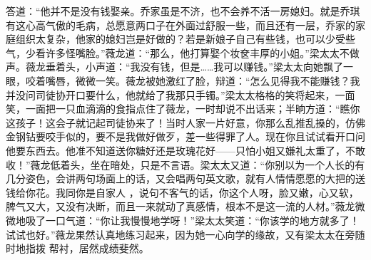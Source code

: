 \documentclass{article}
\begin{document}
\newpage
答道：“他并不是没有钱娶亲。乔家虽是不济，也不会养不活一房媳妇。就是乔琪有这心高气傲的毛病，总愿意两口子在外面过舒服一些，而且还有一层，乔家的家庭组织太复杂，他家的媳妇岂是好做的？若是新娘子自己有些钱，也可以少受些气，少看许多怪嘴脸。”薇龙道：“那么，他打算娶个妆奁丰厚的小姐。”梁太太不做声。薇龙垂着头，小声道：“我没有钱，但是……我可以赚钱。”梁太太向她飘了一眼，咬着嘴唇，微微一笑。薇龙被她激红了脸，辩道：“怎么见得我不能赚钱？我并没问司徒协开口要什么，他就给了我那只手镯。”梁太太格格的笑将起来，一面笑，一面把一只血滴滴的食指点住了薇龙，一时却说不出话来；半晌方道：“瞧你这孩子！这会子就记起司徒协来了！当时人家一片好意，你那么乱推乱搡的，仿佛金钢钻要咬手似的，要不是我做好做歹，差一些得罪了人。现在你且试试看开口问他要东西去。他准不知道送你糖好还是玫瑰花好——只怕小姐又嫌礼太重了，不敢收！”薇龙低着头，坐在暗处，只是不言语。梁太太又道：“你别以为一个人长的有几分姿色，会讲两句场面上的话，又会唱两句英文歌，就有人情情愿愿的大把的送钱给你花。我同你是自家人
\newpage
，说句不客气的话，你这个人呀，脸又嫩，心又软，脾气又大，又没有决断，而且一来就动了真感情，根本不是这一流的人材。”薇龙微微地吸了一口气道：“你让我慢慢地学呀！”梁太太笑道：“你该学的地方就多了！试试也好。”薇龙果然认真地练习起来，因为她一心向学的缘故，又有梁太太在旁随时地指拨
帮衬，居然成绩斐然。 
\end{document}
